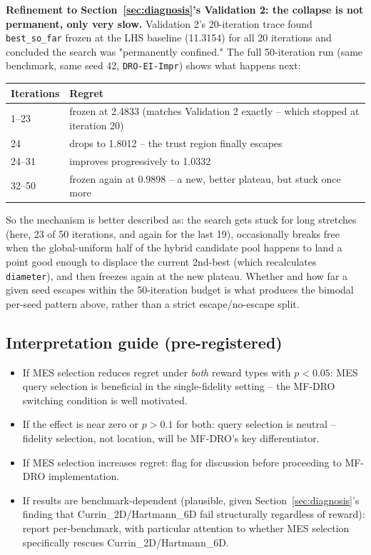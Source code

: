 \documentclass[11pt]{article}
\begin{document}
\textbf{Refinement to Section~\ref{sec:diagnosis}'s Validation 2: the collapse
is not permanent, only very slow.} Validation 2's 20-iteration trace found
\texttt{best\_so\_far} frozen at the LHS baseline (11.3154) for all 20
iterations and concluded the search was "permanently confined." The full
50-iteration run (same benchmark, same seed 42, \texttt{DRO-EI-Impr}) shows
what happens next:
\begin{center}
\small
\begin{tabular}{ll}
\toprule
\textbf{Iterations} & \textbf{Regret} \\
\midrule
1--23  & frozen at 2.4833 (matches Validation 2 exactly -- which stopped at iteration 20) \\
24     & drops to 1.8012 -- the trust region finally escapes \\
24--31 & improves progressively to 1.0332 \\
32--50 & frozen again at 0.9898 -- a new, better plateau, but stuck once more \\
\bottomrule
\end{tabular}
\end{center}
So the mechanism is better described as: the search gets stuck for long
stretches (here, 23 of 50 iterations, and again for the last 19), occasionally
breaks free when the global-uniform half of the hybrid candidate pool happens
to land a point good enough to displace the current 2nd-best (which
recalculates \texttt{diameter}), and then freezes again at the new plateau.
Whether and how far a given seed escapes within the 50-iteration budget is
what produces the bimodal per-seed pattern above, rather than a strict
escape/no-escape split.

\subsection{Interpretation guide (pre-registered)}

\begin{itemize}[itemsep=3pt]
    \item If MES selection reduces regret under \emph{both} reward types with
          $p<0.05$: MES query selection is beneficial in the single-fidelity
          setting -- the MF-DRO switching condition is well motivated.
    \item If the effect is near zero or $p>0.1$ for both: query selection is
          neutral -- fidelity selection, not location, will be MF-DRO's key
          differentiator.
    \item If MES selection increases regret: flag for discussion before
          proceeding to MF-DRO implementation.
    \item If results are benchmark-dependent (plausible, given Section~\ref{sec:diagnosis}'s
          finding that Currin\_2D/Hartmann\_6D fail structurally regardless of
          reward): report per-benchmark, with particular attention to whether
          MES selection specifically rescues Currin\_2D/Hartmann\_6D.
\end{itemize}
\end{document}
